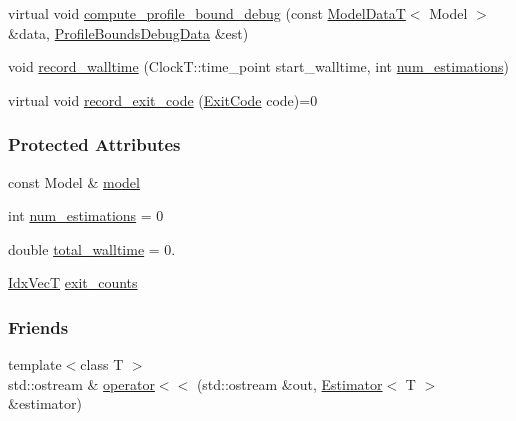 \begin{DoxyCompactItemize}
\item 
virtual void \hyperlink{classmappel_1_1estimator_1_1Estimator_a75c8db8e3151aa5bb2ce3190a613c05c}{compute\+\_\+profile\+\_\+bound\+\_\+debug} (const \hyperlink{namespacemappel_a97f050df953605381ae9c901c3b125f1}{Model\+DataT}$<$ Model $>$ \&data, \hyperlink{namespacemappel_1_1estimator_structmappel_1_1estimator_1_1ProfileBoundsDebugData}{Profile\+Bounds\+Debug\+Data} \&est)
\item 
void \hyperlink{classmappel_1_1estimator_1_1Estimator_a864a87d5dc2937e1d67e6bcffb0b5234}{record\+\_\+walltime} (Clock\+T\+::time\+\_\+point start\+\_\+walltime, int \hyperlink{classmappel_1_1estimator_1_1Estimator_a9f5390f0ac3ee127ddcd90dc6f4fd889}{num\+\_\+estimations})
\item 
virtual void \hyperlink{classmappel_1_1estimator_1_1Estimator_a2fefff348f9c25d7ae2cce9c12b7ec4e}{record\+\_\+exit\+\_\+code} (\hyperlink{namespacemappel_1_1estimator_ae49999202b8a1968bc308aa30ac24e6c}{Exit\+Code} code)=0
\end{DoxyCompactItemize}
\subsubsection*{Protected Attributes}
\begin{DoxyCompactItemize}
\item 
const Model \& \hyperlink{classmappel_1_1estimator_1_1Estimator_a2f157410771fb79a20d4d54e505750d0}{model}
\item 
int \hyperlink{classmappel_1_1estimator_1_1Estimator_a9f5390f0ac3ee127ddcd90dc6f4fd889}{num\+\_\+estimations} = 0
\item 
double \hyperlink{classmappel_1_1estimator_1_1Estimator_a98ad459e850aeb2c42c10fd06c3b9fbc}{total\+\_\+walltime} = 0.
\item 
\hyperlink{namespacemappel_ac63743dcd42180127307cd0e4ecdd784}{Idx\+VecT} \hyperlink{classmappel_1_1estimator_1_1Estimator_aa946d9789a1299d684f83a822a10caa7}{exit\+\_\+counts}
\end{DoxyCompactItemize}
\subsubsection*{Friends}
\begin{DoxyCompactItemize}
\item 
{\footnotesize template$<$class T $>$ }\\std\+::ostream \& \hyperlink{classmappel_1_1estimator_1_1Estimator_a362f3d091ead8a826fb320dfa61e5389}{operator$<$$<$} (std\+::ostream \&out, \hyperlink{classmappel_1_1estimator_1_1Estimator}{Estimator}$<$ T $>$ \&estimator)
\end{DoxyCompactItemize}


